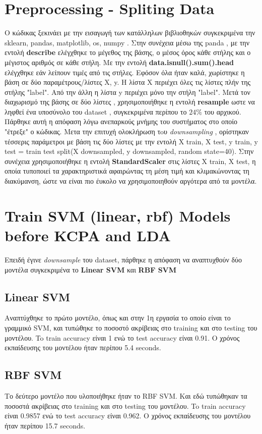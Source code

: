 \section{Preprocessing - Spliting Data}

Ο κώδικας ξεκινάει με την εισαγωγή των κατάλληλων βιβλιοθηκών συγκεκριμένα την
sklearn, pandas, matplotlib, os, numpy . Στην συνέχεια μέσω της panda , με την εντολή \textbf{describe} ελέγχθηκε το μέγεθος της βάσης, ο μέσος
όρος κάθε στήλης και ο μέγιστος αριθμός σε κάθε στήλη. Με την εντολή \textbf{data.isnull().sum().head}
ελέγχθηκε εάν λείπουν τιμές από τις στήλες. Εφόσον όλα ήταν καλά, χωρίστηκε η βάση
σε δύο παραμέτρους/λίστες X, y. Η λίστα X περιέχει όλες τις λίστες πλήν της στήλης
"label". Από την άλλη η λίστα y περιέχει μόνο την στήλη "label". Μετά τον διαχωρισμό
της βάσης σε δύο λίστες , χρησιμοποιήθηκε η εντολή \textbf{resample} ωστε να ληφθεί ένα υποσύνολο του dataset , συγκεκριμένα περίπου το $24\%$ του αρχικού. Πάρθηκε αυτή η απόφαση λόγω ανεπαρκούς μνήμης του συστήματος στο οποίο "έτρεξε" ο κώδικας. 
Mετα την επιτυχή ολοκλήρωση τoυ \emph{downsampling} , ορίστηκαν
τέσσερις παράμετροι με βάση τις δύο λίστες με την εντολή X train, X test, y train, y
test = train test split(X downsampled, y downsampled, random state=40).
Στην συνέχεια χρησιμοποιήθηκε η εντολή \textbf{StandardScaler} στις λίστες Χ train, X test, η οποία τυποποιεί  τα χαρακτηριστικά αφαιρώντας τη μέση τιμή και κλιμακώνοντας τη διακύμανση, ώστε να είναι πιο έυκολο να χρησιμοποιηθούν αργότερα από τα μοντέλα. 

\section{Train SVM (linear, rbf) Models before KCPA and LDA}

Επειδή έγινε \emph{downsample} του dataset, πάρθηκε η απόφαση να αναπτυχθούν δύο μοντέλα συγκεκριμένα το \textbf{Linear SVM} και \textbf{RBF SVM}

\subsection{Linear SVM}
Αναπτύχθηκε το πρώτο μοντέλο, όπως και στην 1η εργασία το οποίο είναι το γραμμικό SVM, και
τυπώθηκε το ποσοστό ακρίβειας στο training και στο testing του μοντέλου. To train accuracy είναι 1 ενώ το test
accuracy είναι 0.91. Ο χρόνος εκπαίδευσης του μοντέλου ήταν περίπου 5.4 seconds.

\subsection{RBF SVM}
Το δεύτερο μοντέλο που υλοποιήθηκε ήταν το RBF SVM. Και εδώ τυπώθηκαν τα ποσοστά
ακρίβειας στο training και στο testing του μοντέλου. To train accuracy είναι 0.9857 ενώ το test accuracy είναι 0.962. Ο χρόνος εκπαίδευσης του μοντέλου ήταν περίπου 15.7 seconds.

